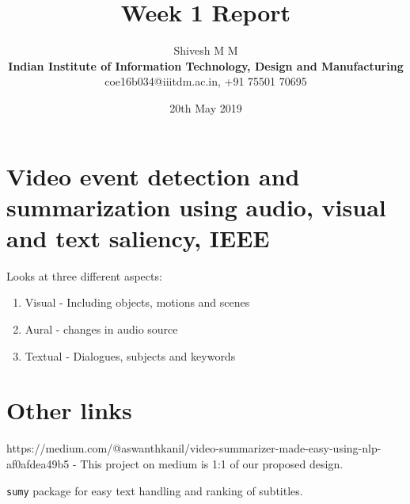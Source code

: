 \documentclass{article}
\title{Week 1 Report}
\author{Shivesh M M\\\textbf{Indian Institute of Information Technology, Design and Manufacturing}\\coe16b034@iiitdm.ac.in, +91 75501 70695}
\date{20th May 2019}
\begin{document}
	\section{Video event detection and summarization using audio, visual and text saliency, IEEE}
	  Looks at three different aspects:
	\begin{enumerate}
		\item Visual - Including objects, motions and scenes
		\item Aural - changes in audio source
		\item Textual - Dialogues, subjects and keywords
	\end{enumerate}
	\section{Other links}
		https://medium.com/@aswanthkanil/video-summarizer-made-easy-using-nlp-af0afdea49b5 - This project on medium is 1:1 of our proposed design.

		\texttt{sumy} package for easy text handling and ranking of subtitles.
\end{document}
